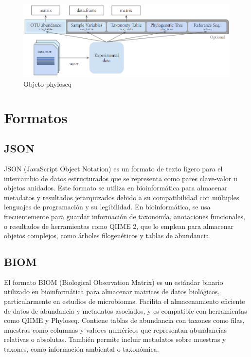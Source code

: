 \begin{figure}[h]
\centering
\includegraphics[width=\textwidth]{Img/cap2/Phyloseq.png}
\caption{Objeto phyloseq }%
\end{figure}

\section{Formatos}

\subsection{JSON}
JSON (JavaScript Object Notation) es un formato de texto ligero para el intercambio de datos estructurados que se representa como pares clave-valor u objetos anidados. Este formato se utiliza en bioinformática para almacenar metadatos y resultados jerarquizados debido a su compatibilidad con múltiples lenguajes de programación y su legibilidad. En bioinformática, se usa frecuentemente para guardar información de taxonomía, anotaciones funcionales, o resultados de herramientas como QIIME 2, que lo emplean para almacenar objetos complejos, como árboles filogenéticos y tablas de abundancia.\\

\subsection{BIOM}
El formato BIOM (Biological Observation Matrix) es un estándar binario utilizado en bioinformática para almacenar matrices de datos biológicos, particularmente en estudios de microbiomas. Facilita el almacenamiento eficiente de datos de abundancia y metadatos asociados, y es compatible con herramientas como QIIME y Phyloseq. Contiene tablas de abundancia con taxones como filas, muestras como columnas y valores numéricos que representan abundancias relativas o absolutas. También permite incluir metadatos sobre muestras y taxones, como información ambiental o taxonómica.\\

